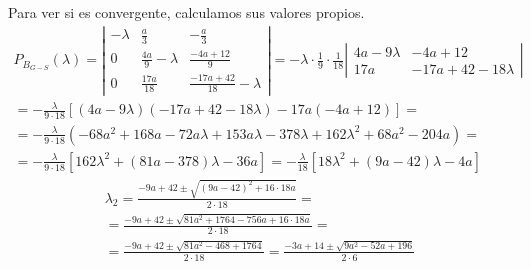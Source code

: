 \documentclass[12pt]{article}
\begin{document}
\begin{ejercicio}
\begin{enumerate}
\begin{enumerate}
            Para ver si es convergente, calculamos sus valores propios.
            \begin{multline*}
                P_{B_{G-S}}(\lambda) = \left| \begin{array}{ccc}
                    -\lambda & \frac{a}{3} & -\frac{a}{3} \\
                    0 & \frac{4a}{9}-\lambda & \frac{-4a+12}{9} \\
                    0 & \frac{17a}{18} & \frac{-17a+42}{18}-\lambda
                \end{array} \right| = -\lambda\cdot \frac{1}{9}\cdot \frac{1}{18}\left| \begin{array}{cc}
                    4a-9\lambda & -4a+12 \\
                    17a & -17a+42-18\lambda
                \end{array} \right| \\
                = -\frac{\lambda}{9\cdot 18} [(4a-9\lambda)(-17a+42-18\lambda) -17a(-4a+12)]
                =\\=
                -\frac{\lambda}{9\cdot 18} (-68a^2 +168a - 72a\lambda+153a\lambda-378\lambda+162\lambda^2 +68a^2-204a)
                =\\=
                -\frac{\lambda}{9\cdot 18}[162\lambda^2 +(81a-378)\lambda-36a]
                =
                -\frac{\lambda}{18}[18\lambda^2 +(9a-42)\lambda-4a]
            \end{multline*}
            \begin{multline*}
                \lambda_2
                = \frac{-9a+42 \pm \sqrt{(9a-42)^2+16\cdot 18a}}{2\cdot 18} 
                =\\=
                \frac{-9a+42 \pm \sqrt{81a^2+1764-756a+16\cdot 18a}}{2\cdot 18} 
                =\\=
                \frac{-9a+42 \pm \sqrt{81a^2-468+1764}}{2\cdot 18}
                =
                \frac{-3a+14 \pm \sqrt{9a^2-52a+196}}{2\cdot 6} 
            \end{multline*}
        \end{enumerate}


\end{enumerate}
\end{ejercicio}
\end{document}
